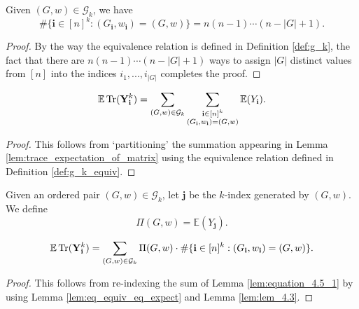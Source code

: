 \begin{lemma}
  \label{lem:lem_4.3}
  Given $(G,w) \in \mathcal{G}_k$, we have
  \[
  \# \{ \mathbf{i} \in [n]^k : (G_\mathbf{i},w_\mathbf{i}) = (G,w) \} = n (n-1) \cdots (n - |G| + 1).
  \]
\end{lemma}
\begin{proof}
  By the way the equivalence relation is defined in Definition \ref{def:g_k}, 
  the fact that there are $n (n - 1) \cdots (n -|G| + 1)$ ways to assign $|G|$ distinct values from $[n]$ into the indices $i_1,...,i_{|G|}$ completes the proof.
\end{proof}
\begin{lemma}
  \label{lem:equation_4.5_1}
  \[
  \mathbb{E} \operatorname{Tr} (\mathbf{Y}_\mathbf{i}^k) = \sum_{(G,w) \in \mathcal{G}_k} \sum_{\substack{\mathbf{i} \in [n]^k \\ (G_\mathbf{i},w_\mathbf{i}) = (G,w)}} \mathbb{E} (Y_\mathbf{i}).
  \]
\end{lemma}
\begin{proof}
  This follows from `partitioning' the summation appearing in Lemma \ref{lem:trace_expectation_of_matrix} using the equivalence relation defined in Definition \ref{def:g_k_equiv}.
\end{proof}
\begin{definition}[$\Pi (G,w)$: R-1-11 : def:Pi.G.w]
  \label{def:Pi.G.w}
  Given an ordered pair $(G,w) \in \mathcal{G}_k$, let $\mathbf{j}$ be the $k$-index generated by $(G,w)$. We define 
  \[
  \Pi (G,w) = \mathbb{E}(Y_\mathbf{j}).
  \]
\end{definition}
\begin{lemma}
  \label{lem:equation_4.5_2}
  \[
  \mathbb{E} \operatorname{Tr} (\mathbf{Y}_\mathbf{i}^k) = \sum_{(G,w) \in \mathcal{G}_k} \Pi (G,w) \cdot \# \{ \mathbf{i} \in [n]^k : (G_\mathbf{i},w_\mathbf{i}) = (G,w) \}.
  \]
\end{lemma}
\begin{proof}
  This follows from re-indexing the sum of Lemma \ref{lem:equation_4.5_1} by using Lemma \ref{lem:eq_equiv_eq_expect} and Lemma \ref{lem:lem_4.3}.
\end{proof}

